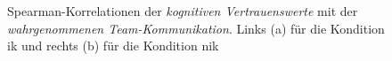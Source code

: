 \documentclass[a4paper,11pt]{article}%
\renewcommand{\\}{\vspace*{0.5\baselineskip} \newline}
\begin{document}
{\begin{figure}[h]
  \centering
  \qquad
  \caption[Spearman-Korrelationen kog. Vertrauen NIK und Team-Kommunikation NIK]{Spearman-Korrelationen der \textit{kognitiven Vertrauenswerte} mit der \textit{wahrgenommenen Team-Kommunikation}. Links (a) für die Kondition \ac{ik} und rechts (b) für die Kondition \ac{nik}}
  \label{SubSig2}
\end{figure}


\clearpage
\newpage

}
\end{document}
